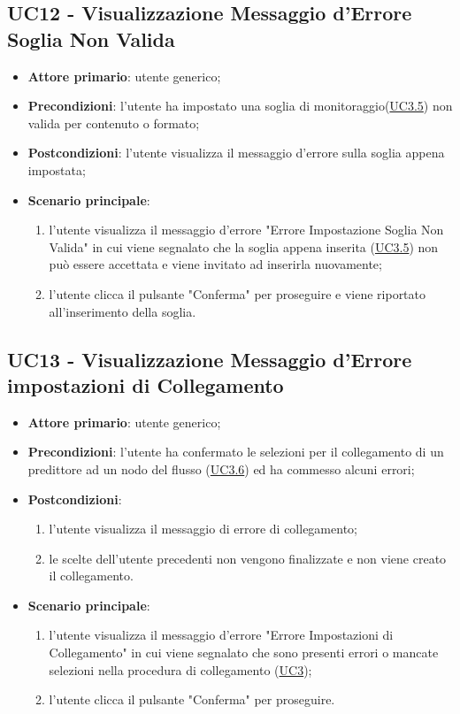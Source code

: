
		\label{par:UC12}
	\subsection{UC12 - Visualizzazione Messaggio d'Errore Soglia Non Valida}
		\begin{itemize}
			\item\textbf{Attore primario}: utente generico;
			\item\textbf{Precondizioni}: l’utente ha impostato una soglia di monitoraggio(\hyperref[par:UC3.5]{UC3.5}) non valida per contenuto o formato;
			\item\textbf{Postcondizioni}: l’utente visualizza il messaggio d'errore sulla soglia appena impostata;		
			\item\textbf{Scenario principale}:
				\begin{enumerate}
					\item l’utente visualizza il messaggio d'errore "Errore Impostazione Soglia Non Valida" in cui viene segnalato che la soglia appena inserita (\hyperref[par:UC3.5]{UC3.5}) non può essere accettata e viene invitato ad inserirla nuovamente;
					\item l'utente clicca il pulsante "Conferma" per proseguire e viene riportato all'inserimento della soglia.		
				\end{enumerate}		
		\end{itemize}


	\label{par:UC13}
	\subsection{UC13 - Visualizzazione Messaggio d'Errore impostazioni di Collegamento}
		\begin{itemize}
			\item\textbf{Attore primario}: utente generico;
			\item\textbf{Precondizioni}: l’utente ha confermato le selezioni per il collegamento di un predittore ad un nodo del flusso (\hyperref[par:UC3.6]{UC3.6}) ed ha commesso alcuni errori;
			\item\textbf{Postcondizioni}:
				\begin{enumerate}
					\item l’utente visualizza il messaggio di errore di collegamento;
					\item le scelte dell'utente precedenti non vengono finalizzate e non viene creato il collegamento.
				\end{enumerate}		
			\item\textbf{Scenario principale}:
				\begin{enumerate}
					\item l’utente visualizza il messaggio d'errore "Errore Impostazioni di Collegamento" in cui viene segnalato che sono presenti errori o mancate selezioni nella procedura di collegamento (\hyperref[par:UC3]{UC3});
					\item l'utente clicca il pulsante "Conferma" per proseguire.		
				\end{enumerate}		
		\end{itemize}

